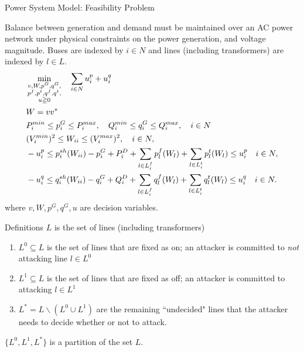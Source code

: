 \documentclass[xcolor=dvipsnames]{beamer}
\newcommand{\p}[1]{p^{#1}}
\newcommand{\q}[1]{q^{#1}}
\newcommand{\ii}{i}
\newcommand{\llll}{l}
\newcommand{\from}{f}
\newcommand{\tto}{t}
\newcommand{\WW}{W}
\newcommand{\Lines}{L}
\begin{document}
\begin{frame}{Power System Model: Feasibility Problem}
\begin{footnotesize}
Balance between generation and demand must be maintained over an AC power network under physical constraints on the power generation, and voltage magnitude.
Buses are indexed by $i \in N$ and lines (including transformers) are indexed by $l \in L$.
\begin{subequations}
\begin{align}
&\min_{\substack{v,W,p^G,q^G,\\ p^f,p^t,q^f,q^t,\\ u \geqq 0}} \quad 
  \sum_{i \in N} u_i^p + u_i^q  \notag \\
  & W = v v^* \notag\\
  & P_i^{min} \leq p_i^G \leq P_i^{max}, \quad Q_i^{min} \leq q_i^G \leq Q_i^{max}, \quad i\in N \notag \\
  & (V_i^{min})^2 \leq W_{ii} \leq (V_i^{max})^2,\quad i\in N, \notag \\
  & -u_i^p \le p_i^{sh}(\WW_{ii}) - p^G_i + P^D_i 
	+ \sum_{\llll \in \Lines_\ii^{\from} } \p{\from}_{\llll}(\WW_\llll)  
	+\sum_{\llll \in \Lines_\ii^{\tto}   } \p{\tto}_{\llll}(\WW_\llll)
	\le u_i^p \quad i\in N, \notag\\ 
  & -u_i^q \le q_i^{sh}(\WW_{ii}) - q^G_i + Q^D_i 
	+ \sum_{\llll \in \Lines_\ii^{\from}} \q{\from}_{\llll}(\WW_\llll)
	+ \sum_{\llll \in \Lines_\ii^{\tto} } \q{\tto}_{\llll}(\WW_\llll)
	\le u_i^q \quad i\in N. \notag
\end{align}
\end{subequations}
where $v,W,p^G,q^G,u$ are decision variables. 
\end{footnotesize}
\end{frame}

\begin{frame}{Definitions}
$L$ is the set of lines (including transformers)
\begin{enumerate}
\item $L^0 \subseteq L$ is the set of lines that are fixed as on; an attacker is committed to \emph{not} attacking line $l \in L^0$
\item $L^1 \subseteq L$ is the set of lines that are fixed as off; an attacker is committed to attacking $l \in L^1$
\item $L^* = L \backslash (L^0 \cup L^1)$ are the remaining ``undecided" lines that the attacker needs to decide whether or not to attack.
\end{enumerate}
$\{ L^0, L^1, L^*\}$ is a partition of the set $L$.
\end{frame}
\end{document}
